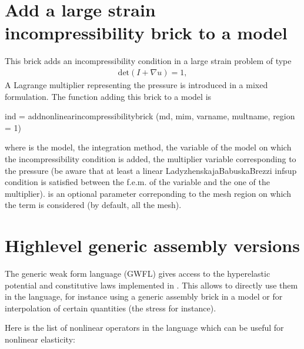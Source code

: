 \documentclass[a4paper,11pt,english]{sphinxmanual}
\begin{document}
\section{Add a large strain incompressibility brick to a model}
\label{\detokenize{userdoc/model_nonlinear_elasticity:add-a-large-strain-incompressibility-brick-to-a-model}}
This brick adds an incompressibility condition in a large strain problem of type
\begin{equation*}
\begin{split}\mbox{det}(I+\nabla u) = 1,\end{split}
\end{equation*}
A Lagrange multiplier representing the pressure is introduced in a mixed formulation. The function adding this brick to a model is

\begin{sphinxVerbatim}[commandchars=\\\{\}]
ind = add\PYGZus{}nonlinear\PYGZus{}incompressibility\PYGZus{}brick
  (md, mim, varname, multname, region = \PYGZhy{}1)
\end{sphinxVerbatim}

where  is the model,  the integration method,  the variable of the model on which the incompressibility condition is added,  the multiplier variable corresponding to the pressure (be aware that at least a linear Ladyzhenskaja\sphinxhyphen{}Babuska\sphinxhyphen{}Brezzi inf\sphinxhyphen{}sup condition is satisfied between the f.e.m. of the variable and the one of the multiplier).  is an optional parameter correponding to the mesh region on which the term is considered (by default, all the mesh).


\section{High\sphinxhyphen{}level generic assembly versions}
\label{\detokenize{userdoc/model_nonlinear_elasticity:high-level-generic-assembly-versions}}
The generic weak form language (GWFL) gives access to the hyperelastic potential and constitutive laws implemented in . This allows to directly use them in the language, for instance using a generic assembly brick in a model or for interpolation of certain quantities (the stress for instance).

Here is the list of nonlinear operators in the language which can be useful for nonlinear elasticity:
\end{document}
